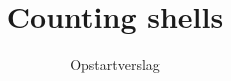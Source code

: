\documentclass[11pt,a4paper]{report}
\title{Counting shells}
\subtitle{Opstartverslag}
\begin{document}
\preface








%

%


%
%
%
%
\end{document}
